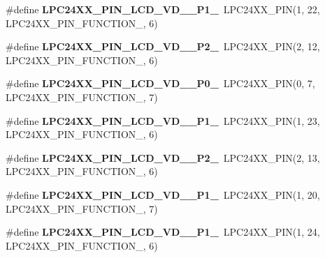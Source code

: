 \begin{DoxyCompactItemize}
\item 
\mbox{\label{group__lpc24xx__io_gab825f665e5c969f86a618ae5457c4f7d}} 
\#define {\bfseries L\+P\+C24\+X\+X\+\_\+\+P\+I\+N\+\_\+\+L\+C\+D\+\_\+\+V\+D\+\_\+\_\+\+P1\+\_}~L\+P\+C24\+X\+X\+\_\+\+P\+IN(1, 22, L\+P\+C24\+X\+X\+\_\+\+P\+I\+N\+\_\+\+F\+U\+N\+C\+T\+I\+O\+N\+\_, 6)
\item 
\mbox{\label{group__lpc24xx__io_gab2ac46135cee2532bfe56ae73f10df35}} 
\#define {\bfseries L\+P\+C24\+X\+X\+\_\+\+P\+I\+N\+\_\+\+L\+C\+D\+\_\+\+V\+D\+\_\+\_\+\+P2\+\_}~L\+P\+C24\+X\+X\+\_\+\+P\+IN(2, 12, L\+P\+C24\+X\+X\+\_\+\+P\+I\+N\+\_\+\+F\+U\+N\+C\+T\+I\+O\+N\+\_, 6)
\item 
\mbox{\label{group__lpc24xx__io_ga46f1f10d8bdee8ece3498c63d3619373}} 
\#define {\bfseries L\+P\+C24\+X\+X\+\_\+\+P\+I\+N\+\_\+\+L\+C\+D\+\_\+\+V\+D\+\_\+\_\+\+P0\+\_}~L\+P\+C24\+X\+X\+\_\+\+P\+IN(0, 7, L\+P\+C24\+X\+X\+\_\+\+P\+I\+N\+\_\+\+F\+U\+N\+C\+T\+I\+O\+N\+\_, 7)
\item 
\mbox{\label{group__lpc24xx__io_gaa291c88eecfd1aad83b55e7443a1e4b1}} 
\#define {\bfseries L\+P\+C24\+X\+X\+\_\+\+P\+I\+N\+\_\+\+L\+C\+D\+\_\+\+V\+D\+\_\+\_\+\+P1\+\_}~L\+P\+C24\+X\+X\+\_\+\+P\+IN(1, 23, L\+P\+C24\+X\+X\+\_\+\+P\+I\+N\+\_\+\+F\+U\+N\+C\+T\+I\+O\+N\+\_, 6)
\item 
\mbox{\label{group__lpc24xx__io_ga8ee0d9a9c318ee8cf0db1bfad5eeae76}} 
\#define {\bfseries L\+P\+C24\+X\+X\+\_\+\+P\+I\+N\+\_\+\+L\+C\+D\+\_\+\+V\+D\+\_\+\_\+\+P2\+\_}~L\+P\+C24\+X\+X\+\_\+\+P\+IN(2, 13, L\+P\+C24\+X\+X\+\_\+\+P\+I\+N\+\_\+\+F\+U\+N\+C\+T\+I\+O\+N\+\_, 6)
\item 
\mbox{\label{group__lpc24xx__io_ga5788d92ec383f405e86f62e92a00e394}} 
\#define {\bfseries L\+P\+C24\+X\+X\+\_\+\+P\+I\+N\+\_\+\+L\+C\+D\+\_\+\+V\+D\+\_\+\_\+\+P1\+\_}~L\+P\+C24\+X\+X\+\_\+\+P\+IN(1, 20, L\+P\+C24\+X\+X\+\_\+\+P\+I\+N\+\_\+\+F\+U\+N\+C\+T\+I\+O\+N\+\_, 7)
\item 
\mbox{\label{group__lpc24xx__io_gad88eb84831f9500ba011c64fd5662ac4}} 
\#define {\bfseries L\+P\+C24\+X\+X\+\_\+\+P\+I\+N\+\_\+\+L\+C\+D\+\_\+\+V\+D\+\_\+\_\+\+P1\+\_}~L\+P\+C24\+X\+X\+\_\+\+P\+IN(1, 24, L\+P\+C24\+X\+X\+\_\+\+P\+I\+N\+\_\+\+F\+U\+N\+C\+T\+I\+O\+N\+\_, 6)

\end{DoxyCompactItemize}

